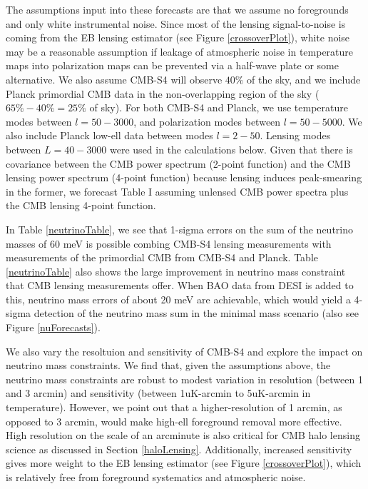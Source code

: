 The assumptions input into these forecasts are that we assume no foregrounds and only white instrumental noise.  
Since most of the lensing signal-to-noise is coming from the EB lensing estimator (see Figure \ref{crossoverPlot}), white noise may be a reasonable assumption if leakage of atmospheric noise in temperature maps into polarization maps can be prevented via a half-wave plate or some alternative.  We also assume CMB-S4 will observe $40\%$ of the sky, and we include Planck primordial CMB data in the non-overlapping region of the sky ($65\% - 40\% = 25\%$ of sky).  For both CMB-S4 and Planck, we use temperature modes between $l=50-3000$, and polarization modes between $l=50-5000$.  We also include Planck low-ell data between modes $l=2-50$. Lensing modes between $L=40-3000$ were used in the calculations below. Given that there is covariance between the CMB power spectrum (2-point function) and the CMB lensing power spectrum (4-point function) because lensing induces peak-smearing in the former, we forecast Table I assuming unlensed CMB power spectra plus the CMB lensing 4-point function.    %

In Table \ref{neutrinoTable}, we see that 1-sigma errors on the sum of the neutrino masses of 60 meV is possible combing CMB-S4 lensing measurements with measurements of the primordial CMB from CMB-S4 and Planck.  Table \ref{neutrinoTable} also shows the large improvement in neutrino mass constraint that CMB lensing measurements offer. When BAO data from DESI is added to this, neutrino mass errors of about 20 meV are achievable, which would yield a 4-sigma detection of the neutrino mass sum in the minimal mass scenario (also see Figure \ref{nuForecasts}).  

We also vary the resoltuion and sensitivity of CMB-S4 and explore the impact on neutrino mass constraints.  We find that, given the assumptions above, the neutrino mass constraints are robust to modest variation in resolution (between 1 and 3 arcmin) and sensitivity (between 1uK-arcmin to 5uK-arcmin in temperature).  However, we point out that a higher-resolution of 1 arcmin, as opposed to 3 arcmin, would make high-ell foreground removal more effective.  High resolution on the scale of an arcminute is also critical for CMB halo lensing science as discussed in Section \ref{haloLensing}.  Additionally, increased sensitivity gives more weight to the EB lensing estimator (see Figure \ref{crossoverPlot}), which is relatively free from foreground systematics and atmospheric noise. 










